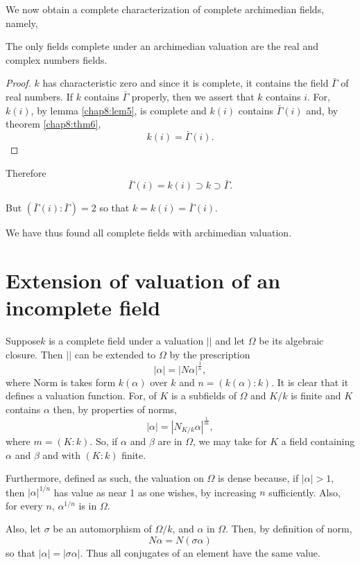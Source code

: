 We now obtain a complete characterization of complete archimedian
fields, namely,  

\begin{thm}\label{chap8:thm7} %
The only fields complete under an archimedian valuation are the
  real and complex numbers fields. 
\end{thm}

\begin{proof}
$k$ has characteristic zero and since it is complete, it contains the
  field $\bar{\Gamma}$ of real numbers. If $k$ contains $\bar{\Gamma}$
  properly, then we assert that $k$ contains $i$. For, $k(i)$, by
  lemma \ref{chap8:lem5}, is complete and $k(i)$ contains
  $\bar{\Gamma}(i)$ and, by   theorem \ref{chap8:thm6},  
$$
k(i) = \bar{\Gamma}(i). 
$$
\end{proof}

Therefore
$$
\bar{\Gamma}(i) = k(i) \supset k \supset \bar{\Gamma}. 
$$

But $(\bar{\Gamma}(i) : \bar{\Gamma}) = 2$ so that $ k = k(i) =
\bar{\Gamma}(i)$. 

We have thus found all complete fields with archimedian valuation. 


\section{Extension of valuation of an incomplete field}%

Suppose\pageoriginale $k$ is a complete field under a valuation $||$
and let  $\Omega$ be its algebraic closure. Then $||$ can be extended
to $\Omega$ by the prescription  
$$
| \alpha | = | N \alpha |^{\frac{1}{n}}, 
$$
where Norm is takes form $k(\alpha)$ over $k$ and $n = (k (\alpha):
k)$. It is clear that it defines a valuation function. For, of $K$ is 
a subfields of $\Omega$ and $K/k$ is finite and $K$ contains $\alpha$ then,
by properties of norms,  
$$
|\alpha| = | N_{ K/k}\alpha|^{\frac{1}{m}},  
$$
where $m = (K : k)$. So, if $\alpha$ and $\beta$ are in $\Omega$, we
may take for $K$ a field containing $\alpha$ and $\beta$ and with $(K
: k)$ finite.  

Furthermore, defined as such, the valuation on $\Omega$ is dense
because, if $|\alpha| > 1$, then $|\alpha|^{ 1/n}$ has value as near
1 as one wishes, by increasing $n$ sufficiently. Also, for every
$n$, $\alpha^{1/n}$ is in $\Omega$.  

Also, let $\sigma$ be an automorphism of $\Omega / k$, and $\alpha$ in
$\Omega$. Then, by definition of norm,  
$$
N \alpha = N (\sigma \alpha) 
$$
so that $ |\alpha| = |\sigma \alpha | $. Thus all conjugates of an
element have the same value.  

